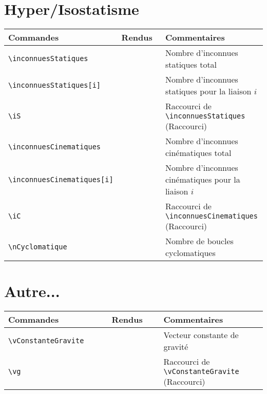 \documentclass[a4paper,12pt]{article}
\newcommand{\rac}{({\color{red}Raccourci})}
\begin{document}
	\section{Hyper/Isostatisme}
		\noindent
		\begin{tabular}{|p{0.4\linewidth}|p{0.2\linewidth}|p{0.4\linewidth}|}
			\hline
				\textbf{Commandes}&\textbf{Rendus}&\textbf{Commentaires}
			\\\hline\hline
				\verb!\inconnuesStatiques!	&	\inconnuesStatiques	&	Nombre d'inconnues statiques total
			\\\hline
				\verb!\inconnuesStatiques[i]!	&	\inconnuesStatiques[i]	&	Nombre d'inconnues statiques pour la liaison $i$
			\\\hline
				\verb!\iS!			&	\iS			&	Raccourci de \verb!\inconnuesStatiques! \rac
			\\\hline
				\verb!\inconnuesCinematiques!	&	\inconnuesCinematiques	&	Nombre d'inconnues cinématiques total
			\\\hline
				\verb!\inconnuesCinematiques[i]!&	\inconnuesCinematiques[i]&	Nombre d'inconnues cinématiques pour la liaison $i$
			\\\hline
				\verb!\iC!			&	\iC			&	Raccourci de \verb!\inconnuesCinematiques! \rac
			\\\hline
				\verb!\nCyclomatique!		&	\nCyclomatique		&	Nombre de boucles cyclomatiques
			\\\hline
		\end{tabular}


	\section{Autre...}
		\noindent
		\begin{tabular}{|p{0.4\linewidth}|p{0.2\linewidth}|p{0.4\linewidth}|}
			\hline
				\textbf{Commandes}&\textbf{Rendus}&\textbf{Commentaires}
			\\\hline\hline
				\verb!\vConstanteGravite!	&	\vConstanteGravite	&	Vecteur constante de gravité
			\\\hline
				\verb!\vg!			&	\vg			&	Raccourci de \verb!\vConstanteGravite! \rac
			\\\hline
		\end{tabular}
\end{document}
